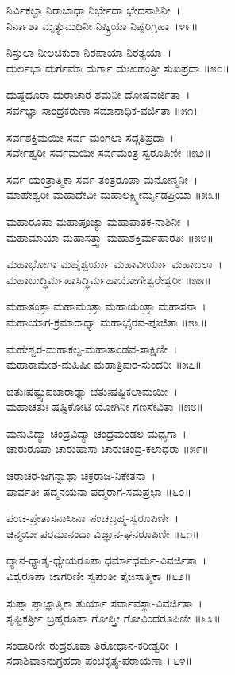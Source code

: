 ನಿರ್ವಿಕಲ್ಪಾ ನಿರಾಬಾಧಾ ನಿರ್ಭೇದಾ ಭೇದನಾಶಿನೀ~।\\
ನಿರ್ನಾಶಾ ಮೃತ್ಯುಮಥಿನೀ ನಿಷ್ಕ್ರಿಯಾ ನಿಷ್ಪರಿಗ್ರಹಾ~।೪೯॥

ನಿಸ್ತುಲಾ ನೀಲಚಿಕುರಾ ನಿರಪಾಯಾ ನಿರತ್ಯಯಾ~।\\
ದುರ್ಲಭಾ ದುರ್ಗಮಾ ದುರ್ಗಾ ದುಃಖಹಂತ್ರೀ ಸುಖಪ್ರದಾ ॥೫೦॥

ದುಷ್ಟದೂರಾ ದುರಾಚಾರ-ಶಮನೀ ದೋಷವರ್ಜಿತಾ~।\\
ಸರ್ವಜ್ಞಾ ಸಾಂದ್ರಕರುಣಾ ಸಮಾನಾಧಿಕ-ವರ್ಜಿತಾ ॥೫೧॥

ಸರ್ವಶಕ್ತಿಮಯೀ ಸರ್ವ-ಮಂಗಲಾ  ಸದ್ಗತಿಪ್ರದಾ~।\\
ಸರ್ವೇಶ್ವರೀ ಸರ್ವಮಯೀ ಸರ್ವಮಂತ್ರ-ಸ್ವರೂಪಿಣೀ ॥೫೨॥

ಸರ್ವ-ಯಂತ್ರಾತ್ಮಿಕಾ ಸರ್ವ-ತಂತ್ರರೂಪಾ ಮನೋನ್ಮನೀ~।\\
ಮಾಹೇಶ್ವರೀ ಮಹಾದೇವೀ ಮಹಾಲಕ್ಷ್ಮೀರ್ಮೃಡಪ್ರಿಯಾ ॥೫೩॥

ಮಹಾರೂಪಾ ಮಹಾಪೂಜ್ಯಾ ಮಹಾಪಾತಕ-ನಾಶಿನೀ~।\\
ಮಹಾಮಾಯಾ ಮಹಾಸತ್ತ್ವಾ ಮಹಾಶಕ್ತಿರ್ಮಹಾರತಿಃ ॥೫೪॥

ಮಹಾಭೋಗಾ ಮಹೈಶ್ವರ್ಯಾ ಮಹಾವೀರ್ಯಾ ಮಹಾಬಲಾ~।\\
ಮಹಾಬುದ್ಧಿರ್ಮಹಾಸಿದ್ಧಿರ್ಮಹಾಯೋಗೇಶ್ವರೇಶ್ವರೀ ॥೫೫॥

ಮಹಾತಂತ್ರಾ ಮಹಾಮಂತ್ರಾ ಮಹಾಯಂತ್ರಾ ಮಹಾಸನಾ~।\\
ಮಹಾಯಾಗ-ಕ್ರಮಾರಾಧ್ಯಾ ಮಹಾಭೈರವ-ಪೂಜಿತಾ ॥೫೬॥

ಮಹೇಶ್ವರ-ಮಹಾಕಲ್ಪ-ಮಹಾತಾಂಡವ-ಸಾಕ್ಷಿಣೀ~।\\
ಮಹಾಕಾಮೇಶ-ಮಹಿಷೀ ಮಹಾತ್ರಿಪುರ-ಸುಂದರೀ ॥೫೭॥

ಚತುಃಷಷ್ಟ್ಯುಪಚಾರಾಢ್ಯಾ ಚತುಃಷಷ್ಟಿಕಲಾಮಯೀ~।\\
ಮಹಾಚತುಃ-ಷಷ್ಟಿಕೋಟಿ-ಯೋಗಿನೀ-ಗಣಸೇವಿತಾ ॥೫೮॥

ಮನುವಿದ್ಯಾ ಚಂದ್ರವಿದ್ಯಾ ಚಂದ್ರಮಂಡಲ-ಮಧ್ಯಗಾ~।\\
ಚಾರುರೂಪಾ ಚಾರುಹಾಸಾ ಚಾರುಚಂದ್ರ-ಕಲಾಧರಾ ॥೫೯॥

ಚರಾಚರ-ಜಗನ್ನಾಥಾ ಚಕ್ರರಾಜ-ನಿಕೇತನಾ~।\\
ಪಾರ್ವತೀ ಪದ್ಮನಯನಾ ಪದ್ಮರಾಗ-ಸಮಪ್ರಭಾ ॥೬೦॥

ಪಂಚ-ಪ್ರೇತಾಸನಾಸೀನಾ ಪಂಚಬ್ರಹ್ಮ-ಸ್ವರೂಪಿಣೀ~।\\
ಚಿನ್ಮಯೀ ಪರಮಾನಂದಾ ವಿಜ್ಞಾನ-ಘನರೂಪಿಣೀ ॥೬೧॥

ಧ್ಯಾನ-ಧ್ಯಾತೃ-ಧ್ಯೇಯರೂಪಾ ಧರ್ಮಾಧರ್ಮ-ವಿವರ್ಜಿತಾ~।\\
ವಿಶ್ವರೂಪಾ ಜಾಗರಿಣೀ ಸ್ವಪಂತೀ ತೈಜಸಾತ್ಮಿಕಾ ॥೬೨॥

ಸುಪ್ತಾ ಪ್ರಾಜ್ಞಾತ್ಮಿಕಾ ತುರ್ಯಾ ಸರ್ವಾವಸ್ಥಾ-ವಿವರ್ಜಿತಾ~।\\
ಸೃಷ್ಟಿಕರ್ತ್ರೀ ಬ್ರಹ್ಮರೂಪಾ ಗೋಪ್ತ್ರೀ ಗೋವಿಂದರೂಪಿಣೀ ॥೬೩॥

ಸಂಹಾರಿಣೀ ರುದ್ರರೂಪಾ ತಿರೋಧಾನ-ಕರೀಶ್ವರೀ~।\\
ಸದಾಶಿವಾಽನುಗ್ರಹದಾ ಪಂಚಕೃತ್ಯ-ಪರಾಯಣಾ ॥೬೪॥

